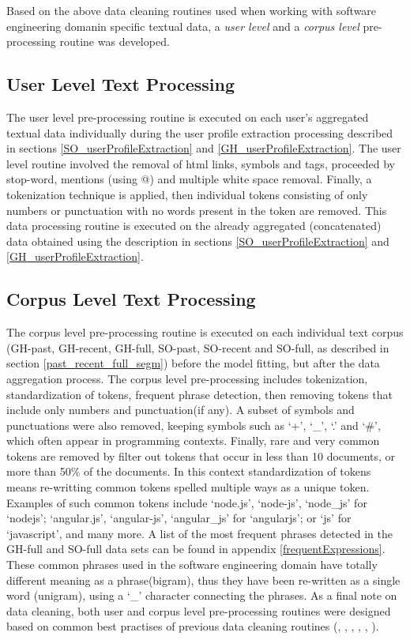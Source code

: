     Based on the above data cleaning routines used when working with software engineering domanin specific textual data, a \emph{user level} and a \emph{corpus level} pre-processing routine was developed. 
    
    \subsection{User Level Text Processing}
    
        The user level pre-processing routine is executed on each user's aggregated textual data individually during the user profile extraction processing described in sections \ref{SO_userProfileExtraction} and \ref{GH_userProfileExtraction}. The user level routine involved the removal of html links, symbols and tags, proceeded by stop-word, mentions (using @) and multiple white space removal. Finally, a tokenization technique is applied, then individual tokens consisting of only numbers or punctuation with no words present in the token are removed. This data processing routine is executed on the already aggregated (concatenated) data obtained using the description in sections \ref{SO_userProfileExtraction} and \ref{GH_userProfileExtraction}.
        
    \subsection{Corpus Level Text Processing}
    
        The corpus level pre-processing routine is executed on each individual text corpus (GH-past, GH-recent, GH-full, SO-past, SO-recent and SO-full, as described in section \ref{past_recent_full_segm}) before the model fitting, but after the data aggregation process. The corpus level pre-processing includes tokenization, standardization of tokens, frequent phrase detection, then removing tokens that include only numbers and punctuation(if any). A subset of symbols and punctuations were also removed, keeping symbols such as ‘+’, ‘\_’, ‘.’ and ‘\#’, which often appear in programming contexts. Finally, rare and very common tokens are removed by filter out tokens that occur in less than 10 documents, or more than 50\% of the documents. In this context standardization of tokens means re-writting common tokens spelled multiple ways as a unique token. Examples of such common tokens include ‘node.js’, ‘node-js’, ‘node\_js’ for ‘nodejs’; ‘angular.js’, ‘angular-js’, ‘angular\_js’ for ‘angularjs’; or ‘js’ for ‘javascript’, and many more. A list of the most frequent phrases detected in the GH-full and SO-full data sets can be found in appendix \ref{frequentExpressions}. These common phrases used in the software engineering domain have totally different meaning as a phrase(bigram), thus they have been re-written as a single word (unigram), using a ‘\_’ character connecting the phrases. As a final note on data cleaning, both user and corpus level pre-processing routines were designed based on common best practises of previous data cleaning routines (\cite{tian2013predicting}, \cite{campbell2015latent}, \cite{treude2019predicting}, \cite{efstathiou2018word}, \cite{boyd2014care}, \cite{liao2019status}).

